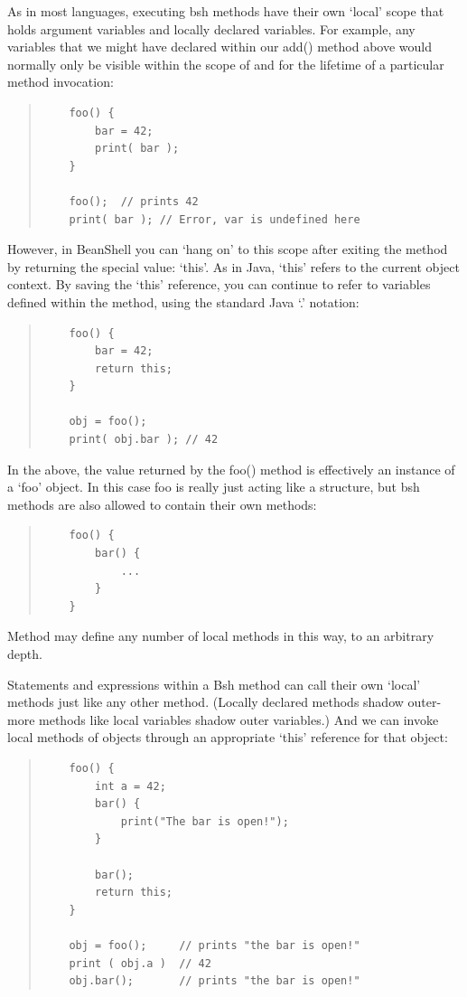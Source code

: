 \documentclass[twoside,11pt]{article}
\renewcommand{\_}{\texttt{\symbol{95}}}
\begin{document}
As in most languages, executing bsh methods have their own `local' scope
that holds argument variables and locally declared variables.  For example,
any variables that we might have declared within our add() method above would
normally only be visible within the scope of and for the lifetime of a
particular method invocation:
\begin{quote}
\begin{verbatim}
    foo() {
        bar = 42;
        print( bar );
    }

    foo();  // prints 42
    print( bar ); // Error, var is undefined here
\end{verbatim}
\end{quote}
However, in BeanShell you can `hang on' to this scope after exiting
the method by returning the special value: `this'.  As in Java, `this'
refers to the current object context.  By saving the `this' reference,
you can continue to refer to variables defined within the method,
using the standard Java `.' notation:
\begin{quote}
\begin{verbatim}
    foo() {
        bar = 42;
        return this;
    }

    obj = foo();
    print( obj.bar ); // 42
\end{verbatim}
\end{quote}

In the above, the value returned by the foo() method is effectively an
instance of a `foo' object.  In this case foo is really just acting
like a structure, but bsh methods are also allowed to contain their
own methods:
\begin{quote}
\begin{verbatim}
    foo() {
        bar() {
            ...
        }
    }
\end{verbatim}
\end{quote}
Method may define any number of local methods in this way, to an arbitrary
depth.

Statements and expressions within a Bsh method can call their own
`local' methods just like any other method.  (Locally declared methods
shadow outer-more methods like local variables shadow outer
variables.)  And we can invoke local methods of objects through an
appropriate `this' reference for that object:
\begin{quote}
\begin{verbatim}
    foo() {
        int a = 42;
        bar() {
            print("The bar is open!");
        }

        bar();
        return this;
    }

    obj = foo();     // prints "the bar is open!"
    print ( obj.a )  // 42
    obj.bar();       // prints "the bar is open!"
\end{verbatim}
\end{quote}
\end{document}
